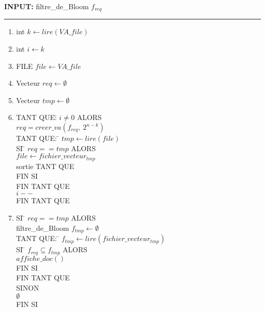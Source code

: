 \documentclass[a4paper,12pt]{report}
\begin{document}
	\begin{flushleft}
		\begin{framed}
			\textbf{INPUT:} filtre\_de\_Bloom $f_{req}$
			\noindent\rule{\linewidth}{0.5pt}

		\begin{enumerate}
			\item int $k \leftarrow lire(VA\_file)$
			\item int $i \leftarrow k$
			\item FILE $file \leftarrow VA\_file$
			\item Vecteur $req \leftarrow \emptyset$
			\item Vecteur $tmp \leftarrow \emptyset$
			\item
			\begin{tabbing}
				TANT QUE:\= $i \neq 0$ ALORS\\
				\> $ req = creer\_va(f_{req},\ 2^{n - k})$\\
				\> TANT QUE: \= $tmp \leftarrow lire(file)$\\
				\> \> SI \= $req == tmp$ ALORS\\
				\> \> \> $file \leftarrow fichier\_vecteur_{tmp}$\\
				\> \> \> sortie TANT QUE\\
				\> \> FIN SI\\
				\> FIN TANT QUE\\
				\> $i--$\\
				FIN TANT QUE
			\end{tabbing}
			\item
			\begin{tabbing}
				SI \= $req == tmp$ ALORS\\
				\> filtre\_de\_Bloom $f_{tmp} \leftarrow \emptyset $\\
				\> TANT QUE: \= $f_{tmp} \leftarrow lire(fichier\_vecteur_{tmp})$ \\
				\> \> SI \= $f_{req} \subseteq f_{tmp}$ ALORS\\
				\> \> \> $affiche\_doc()$ \\
				\> \> FIN SI\\
				\> FIN TANT QUE\\
				SINON \\
				\> $\emptyset$\\
				FIN SI			
			\end{tabbing}
		\end{enumerate}
		\end{framed}
	\end{flushleft}
\end{document}
